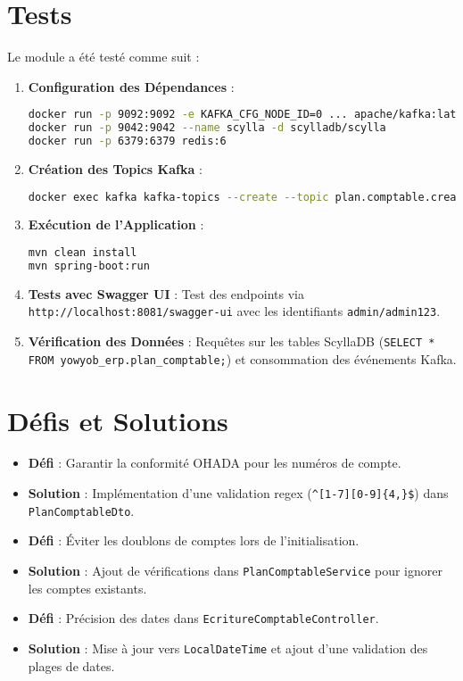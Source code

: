 \documentclass[a4paper,12pt]{article}
\begin{document}
\section{Tests}
Le module a été testé comme suit :
\begin{enumerate}
    \item \textbf{Configuration des Dépendances} :
    \begin{lstlisting}[language=bash]
docker run -p 9092:9092 -e KAFKA_CFG_NODE_ID=0 ... apache/kafka:latest
docker run -p 9042:9042 --name scylla -d scylladb/scylla
docker run -p 6379:6379 redis:6
    \end{lstlisting}
    \item \textbf{Création des Topics Kafka} :
    \begin{lstlisting}[language=bash]
docker exec kafka kafka-topics --create --topic plan.comptable.created ...
    \end{lstlisting}
    \item \textbf{Exécution de l'Application} :
    \begin{lstlisting}[language=bash]
mvn clean install
mvn spring-boot:run
    \end{lstlisting}
    \item \textbf{Tests avec Swagger UI} : Test des endpoints via \texttt{http://localhost:8081/swagger-ui} avec les identifiants \texttt{admin/admin123}.
    \item \textbf{Vérification des Données} : Requêtes sur les tables ScyllaDB (\texttt{SELECT * FROM yowyob_erp.plan_comptable;}) et consommation des événements Kafka.
\end{enumerate}

\section{Défis et Solutions}
\begin{itemize}
    \item \textbf{Défi} : Garantir la conformité OHADA pour les numéros de compte.
    \item \textbf{Solution} : Implémentation d'une validation regex (\texttt{^[1-7][0-9]\{4,\}\$}) dans \texttt{PlanComptableDto}.
    \item \textbf{Défi} : Éviter les doublons de comptes lors de l'initialisation.
    \item \textbf{Solution} : Ajout de vérifications dans \texttt{PlanComptableService} pour ignorer les comptes existants.
    \item \textbf{Défi} : Précision des dates dans \texttt{EcritureComptableController}.
    \item \textbf{Solution} : Mise à jour vers \texttt{LocalDateTime} et ajout d'une validation des plages de dates.
\end{itemize}
\end{document}
